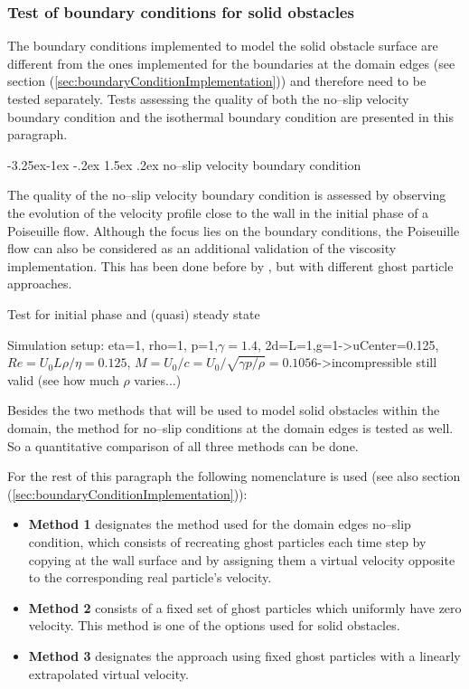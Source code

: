 \documentclass{report}
\makeatletter
\renewcommand\paragraph{\@startsection{paragraph}{4}{\z@}%
  {-3.25ex\@plus -1ex \@minus -.2ex}%
  {1.5ex \@plus .2ex}%
  {\normalfont\normalsize\bfseries}}
\makeatother
\begin{document}
\subsubsection{Test of boundary conditions for solid obstacles}
\label{sec:TestSolobs_BC}
The boundary conditions implemented to model the solid obstacle surface are different from the ones implemented for the boundaries at the domain edges (see section (\ref{sec:boundaryConditionImplementation})) and therefore need to be tested separately.
Tests assessing the quality of both the no--slip velocity boundary condition and the isothermal boundary condition are presented in this paragraph. 

\paragraph{no--slip velocity boundary condition}
\label{sec:TestSolobs_BC_noSlip}

The quality of the no--slip velocity boundary condition is assessed by observing the evolution of the velocity profile close to the wall in the initial phase of a Poiseuille flow. Although the focus lies on the boundary conditions, the Poiseuille flow can also be considered as an additional validation of the viscosity implementation. This has been done before by \cite{Basa2009}, but with different ghost particle approaches.



Test for initial phase and (quasi) steady state

Simulation setup: eta=1, rho=1, p=1,$\gamma=1.4$, 2d=L=1,g=1->uCenter=0.125, $Re=U_0 L \rho/\eta=0.125$, $M=U_0/c=U_0/\sqrt{\gamma p/\rho}=0.1056$->incompressible still valid (see how much $\rho$ varies...)

Besides the two methods that will be used to model solid obstacles within the domain, the method for no--slip conditions at the domain edges is tested as well. So a quantitative comparison of all three methods can be done.

For the rest of this paragraph the following nomenclature is used (see also section (\ref{sec:boundaryConditionImplementation})):
\begin{itemize}
 \item {\bf Method 1} designates the method used for the domain edges no--slip condition, which consists of recreating ghost particles each time step by copying at the wall surface and  by assigning them a virtual velocity opposite to the corresponding real particle's velocity.
\item {\bf Method 2} consists of a fixed set of ghost particles which uniformly have zero velocity. This method is one of the options used for solid obstacles.
\item {\bf Method 3} designates the approach using fixed ghost particles with a linearly extrapolated virtual velocity.
\end{itemize}
\end{document}
